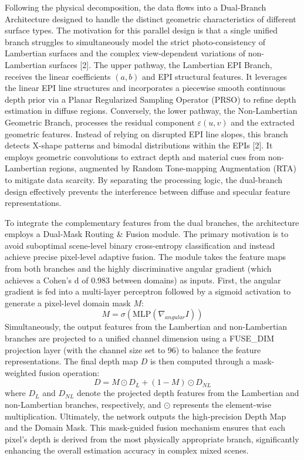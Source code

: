 Following the physical decomposition, the data flows into a Dual-Branch Architecture designed to handle the distinct geometric characteristics of different surface types. The motivation for this parallel design is that a single unified branch struggles to simultaneously model the strict photo-consistency of Lambertian surfaces and the complex view-dependent variations of non-Lambertian surfaces [2]. The upper pathway, the Lambertian EPI Branch, receives the linear coefficients $(a,b)$ and EPI structural features. It leverages the linear EPI line structures and incorporates a piecewise smooth continuous depth prior via a Planar Regularized Sampling Operator (PRSO) to refine depth estimation in diffuse regions. Conversely, the lower pathway, the Non-Lambertian Geometric Branch, processes the residual component $\varepsilon(u,v)$ and the extracted geometric features. Instead of relying on disrupted EPI line slopes, this branch detects X-shape patterns and bimodal distributions within the EPIs [2]. It employs geometric convolutions to extract depth and material cues from non-Lambertian regions, augmented by Random Tone-mapping Augmentation (RTA) to mitigate data scarcity. By separating the processing logic, the dual-branch design effectively prevents the interference between diffuse and specular feature representations.

To integrate the complementary features from the dual branches, the architecture employs a Dual-Mask Routing \& Fusion module. The primary motivation is to avoid suboptimal scene-level binary cross-entropy classification and instead achieve precise pixel-level adaptive fusion. The module takes the feature maps from both branches and the highly discriminative angular gradient (which achieves a Cohen's d of 0.983 between domains) as inputs. First, the angular gradient is fed into a multi-layer perceptron followed by a sigmoid activation to generate a pixel-level domain mask $M$:
\begin{equation}
\label{eq:eq3}
M = \sigma(\text{MLP}(\nabla_{angular} I))
\end{equation}
Simultaneously, the output features from the Lambertian and non-Lambertian branches are projected to a unified channel dimension using a FUSE\_DIM projection layer (with the channel size set to 96) to balance the feature representations. The final depth map $D$ is then computed through a mask-weighted fusion operation:
\begin{equation}
\label{eq:eq4}
D = M \odot D_L + (1 - M) \odot D_{NL}
\end{equation}
where $D_L$ and $D_{NL}$ denote the projected depth features from the Lambertian and non-Lambertian branches, respectively, and $\odot$ represents the element-wise multiplication. Ultimately, the network outputs the high-precision Depth Map and the Domain Mask. This mask-guided fusion mechanism ensures that each pixel's depth is derived from the most physically appropriate branch, significantly enhancing the overall estimation accuracy in complex mixed scenes.

